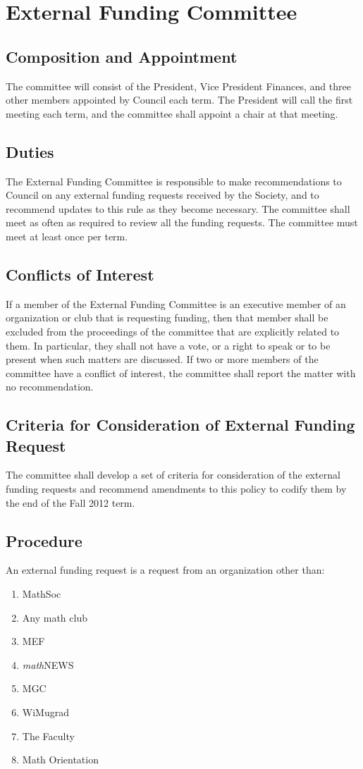 \section{External Funding Committee}
\subsection{Composition and Appointment}
The committee will consist of the President, Vice President Finances, and three
other members appointed by Council each term. The President will call the first
meeting each term, and the committee shall appoint a chair at that meeting.

\subsection{Duties}
The External Funding Committee is responsible to make recommendations to Council
on any external funding requests received by the Society, and to recommend
updates to this rule as they become necessary. The committee shall meet as often
as required to review all the funding requests. The committee must meet at least
once per term.

\subsection{Conflicts of Interest}
If a member of the External Funding Committee is an executive member of an
organization or club that is requesting funding, then that member shall be
excluded from the proceedings of the committee that are explicitly related to
them. In particular, they shall not have a vote, or a right to speak or to be
present when such matters are discussed. If two or more members of the committee
have a conflict of interest, the committee shall report the matter with no
recommendation.

\subsection{Criteria for Consideration of External Funding Request}
The committee shall develop a set of criteria for consideration of the external
funding requests and recommend amendments to this policy to codify them by the
end of the Fall 2012 term.

\subsection{Procedure}
An external funding request is a request from an organization other than:
\begin{enumerate}
  \item MathSoc
  \item Any math club
  \item MEF
  \item \textit{math}\textsf{NEWS}
  \item MGC
  \item WiMugrad
  \item The Faculty
  \item Math Orientation
\end{enumerate}

